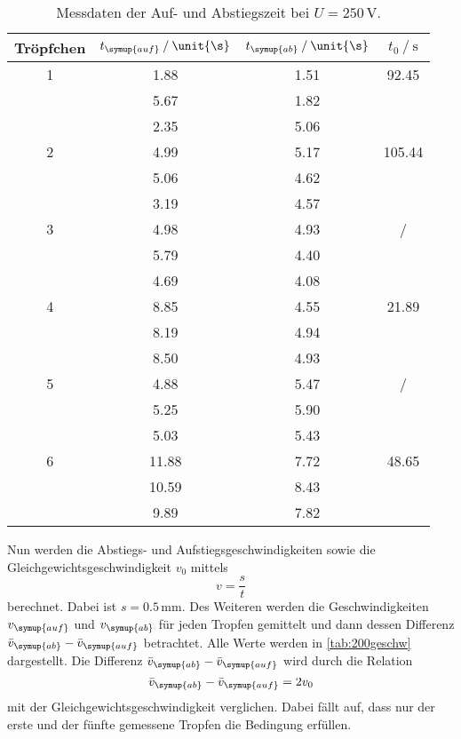\begin{table}
    \centering
    \caption{Messdaten der Auf- und Abstiegszeit bei $U=250\,\unit{\V}$.}
\begin{tabular}{c c c c}
    \toprule
        Tröpfchen &$t_{\symup{auf}} \mathbin{/} \unit{\s}$ & $t_{\symup{ab}}\mathbin{/} \unit{\s}$ & $t_0 \mathbin{/}\unit{\s}$ \\
    \midrule
    1&1.88&1.51&92.45 \\
    &5.67&1.82& \\
    &2.35&5.06& \\
2&4.99&5.17&105.44 \\
    &5.06&4.62& \\
    &3.19&4.57& \\
  3&4.98&4.93&/ \\
     &5.79&4.40& \\
    &4.69&4.08& \\
4&8.85&4.55&21.89 \\
    &8.19&4.94& \\
     &8.50&4.93& \\
  5&4.88&5.47&/ \\
     &5.25&5.90& \\
    &5.03&5.43& \\
6&11.88&7.72&48.65 \\
   &10.59&8.43& \\
    &9.89&7.82& \\
    \bottomrule
    \end{tabular}
    \label{tab:250}
\end{table}

\newpage
Nun werden die Abstiegs- und Aufstiegsgeschwindigkeiten sowie die Gleichgewichtsgeschwindigkeit $v_0$ mittels
\begin{equation*}
    v=\frac{s}{t}
\end{equation*} 
berechnet. Dabei ist $s=0.5\,\unit{\milli\m}$. Des Weiteren werden die Geschwindigkeiten $v_{\symup{auf}}$ und $v_{\symup{ab}}$ für jeden Tropfen gemittelt und dann
dessen Differenz $\bar{v}_{\symup{ab}}-\bar{v}_{\symup{auf}}$ betrachtet. Alle Werte werden in \autoref{tab:200geschw} dargestellt. 
Die Differenz $\bar{v}_{\symup{ab}}-\bar{v}_{\symup{auf}}$ wird durch die Relation
\begin{equation}
    \bar{v}_{\symup{ab}}-\bar{v}_{\symup{auf}} = 2v_0
    \label{eqn:gültigkeit}
\end{equation}
mit der Gleichgewichtsgeschwindigkeit verglichen. Dabei fällt auf, dass nur der erste und der fünfte gemessene Tropfen die Bedingung erfüllen. 



